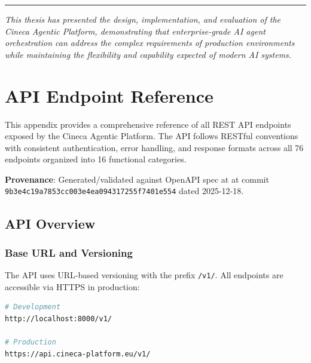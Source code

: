 \documentclass[a4paper,twoside]{sapthesis}
\begin{document}
\vspace{1em}
\noindent\rule{\textwidth}{0.4pt}
\vspace{0.5em}

\textit{This thesis has presented the design, implementation, and evaluation of the Cineca Agentic Platform, demonstrating that enterprise-grade AI agent orchestration can address the complex requirements of production environments while maintaining the flexibility and capability expected of modern AI systems.}



\appendix

\chapter{API Endpoint Reference}
\label{app:api-reference}

This appendix provides a comprehensive reference of all REST API endpoints exposed by the Cineca Agentic Platform. The API follows RESTful conventions with consistent authentication, error handling, and response formats across all 76 endpoints organized into 16 functional categories.

\textbf{Provenance}: Generated/validated against OpenAPI spec at  at commit \texttt{9b3e4c19a7853cc003e4ea094317255f7401e554} dated 2025-12-18.

\section{API Overview}
\label{app:api:overview}

\subsection{Base URL and Versioning}

The API uses URL-based versioning with the prefix \texttt{/v1/}. All endpoints are accessible via HTTPS in production:

\begin{lstlisting}[language=bash]
# Development
http://localhost:8000/v1/

# Production
https://api.cineca-platform.eu/v1/
\end{lstlisting}
\end{document}
